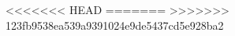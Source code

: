 <<<<<<< HEAD
=======
>>>>>>> 123fb9538ea539a9391024e9de5437cd5e928ba2
%
%
%
%
%
%
%
%
%

%
%

%
%



\newcommand{\FirstNameAuthor}{First Names}
\newcommand{\SurnameAuthor}{Surname}
\newcommand{\IdAuthor}{$\langle$student id$\rangle$}  %

